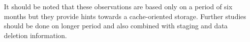 
It should be noted that these observations are based only on a period of six months but they provide hints towards a cache-oriented storage. Further studies should be done on longer period and also combined with staging and data deletion information. 
